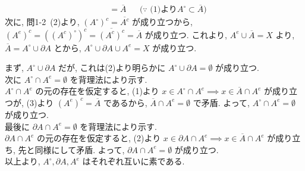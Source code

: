 \begin{nmprob}
{\begin{align*}
                            &= \overline{A}&&\text{($\because$ (1)より$A^\circ \subset \overline{A}$)} 
\end{align*}
次に, 問1-2\ (2)より, $(A^\circ)^c = \overline{A^c}$ が成り立つから, $(A^e)^c = ((A^c)^\circ)^c = \overline{(A^c)^c} = \overline{A}$ が成り立つ. これより, $A^e \cup \overline{A} = X$ より, 
$\overline{A} = A^\circ \cup \partial A$ とから, $A^\circ \cup \partial A \cup A^e = X$ が成り立つ.
\item
まず, $A^\circ \cup \partial A$ だが, これは(2)より明らかに $A^\circ \cup \partial A = \emptyset$ が成り立つ.\\
次に $A^\circ \cap A^e = \emptyset$ を背理法により示す.\\
$A^\circ \cap A^e$ の元の存在を仮定すると, (1)より $x \in A^\circ \cap A^e \implies x \in \overline{A} \cap A^e$ が成り立つが, (3)より $(A^e)^c = \overline{A}$ であるから, $\overline{A} \cap A^e = \emptyset$
で矛盾. よって, $A^\circ \cap A^e = \emptyset$ が成り立つ.\\
最後に $\partial A \cap A^e = \emptyset$ を背理法により示す.\\
$\partial A \cap A^e$ の元の存在を仮定すると, (2)より $x \in \partial A \cap A^e \implies x \in \overline{A} \cap A^e$ が成り立ち, 先と同様にして矛盾. よって, $\partial A \cap A^e = \emptyset$ が成り立つ.\\
以上より, $A^\circ, \partial A, A^e$ はそれぞれ互いに素である.
}
\end{nmprob}



